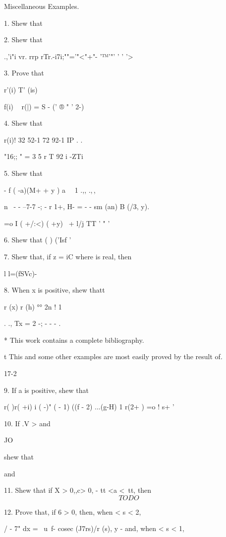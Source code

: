 Miscellaneous Examples.

1. Shew that


2. Shew that

.,'i"i vr. rrp rTr.-i7i;""='"<"+"- '™'"' ' ' '>

3. Prove that

r'(i) T' (is)

f(i) ~ r(|) = S - (' ® " ' 2-)

4. Shew that

 r(i)! 32 52-1 72 92-1 IP . .

"16;; " = 3  5  r T  92  i -ZTi  

5. Shew that

- f ( -a)(M+ + y ) a \ \ 1 .,, .,\,,

n \ - - --7-7 -; - r 1+, H- = - - sm (an) B (/3, y).

 =o I ( +/:<) ( +y) \ + l/j TT ' " '


6. Shew that ( ) ('Isf ' 

7. Shew that, if z = iC where is real, then

l l=\/(fSVc)- 

8. When x is positive, shew thatt

r (x) r (h) °° 2n ! 1

 . ., Tx = 2 -; - - - . 

* This work contains a complete bibliography.

t This and some other examples are most easily proved by the result of.

17-2

%
%

9. If a is positive, shew that

r( )r( +i) i ( -)" ( - 1) ((f - 2) ...(g-H) 1 r(2+ ) =o ! s+ '

10. If .V > and

JO

shew that

and

11. Shew that if X > 0,,c> 0, - tt <a <\ tt, then
$$
TODO
$$

12. Prove that, if 6 > 0, then, when < s < 2,

/ - 7" dx = \ u\ f- cosec (J7rs)/r (s), y - and, when < s < 1,

